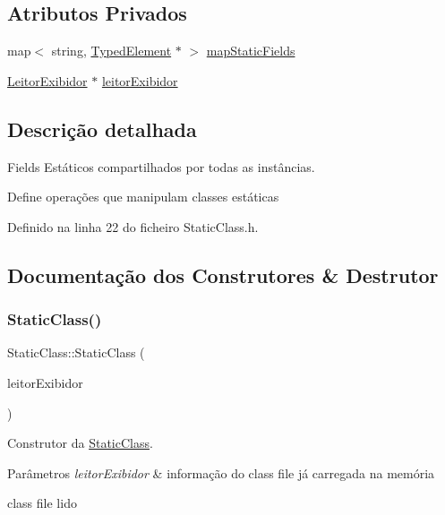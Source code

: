 \subsection*{Atributos Privados}
\begin{DoxyCompactItemize}
\item 
map$<$ string, \hyperlink{BasicTypes_8h_a97b332303b1262282599e6ede0637b82}{Typed\+Element} $\ast$ $>$ \hyperlink{classStaticClass_a06b8f600ddea87eecdce9eef07af9a14}{map\+Static\+Fields}
\item 
\hyperlink{classLeitorExibidor}{Leitor\+Exibidor} $\ast$ \hyperlink{classStaticClass_a3ed320a651b791f4b9bd2c4bd4b81369}{leitor\+Exibidor}
\end{DoxyCompactItemize}


\subsection{Descrição detalhada}
Fields Estáticos compartilhados por todas as instâncias. 

Define operações que manipulam classes estáticas 

Definido na linha 22 do ficheiro Static\+Class.\+h.



\subsection{Documentação dos Construtores \& Destrutor}
\mbox{\label{classStaticClass_a328a35510e7d0b0811a976bc989d195a}} 
\subsubsection{\texorpdfstring{Static\+Class()}{StaticClass()}}
{\footnotesize\ttfamily Static\+Class\+::\+Static\+Class (\begin{DoxyParamCaption}\item[{\hyperlink{classLeitorExibidor}{Leitor\+Exibidor} $\ast$}]{leitor\+Exibidor }\end{DoxyParamCaption})}



Construtor da \hyperlink{classStaticClass}{Static\+Class}. 


\begin{DoxyParams}{Parâmetros}
{\em leitor\+Exibidor} & informação do class file já carregada na memória \\
\hline
\end{DoxyParams}
class file lido

